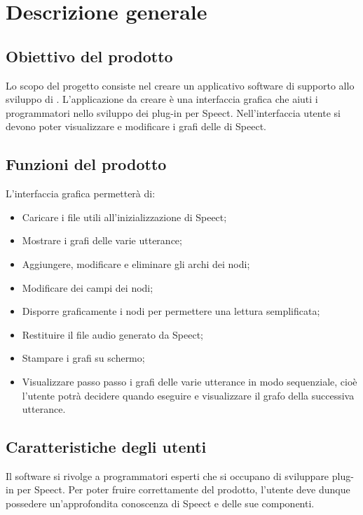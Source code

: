 \documentclass[../AnalisideiRequisiti.tex]{subfiles}
\begin{document}
	
\chapter{Descrizione generale}

\section{Obiettivo del prodotto}

Lo scopo del progetto consiste nel creare un applicativo software di supporto allo sviluppo di . L’applicazione da creare è una interfaccia grafica che aiuti i programmatori nello sviluppo dei plug-in per Speect. Nell’interfaccia utente si devono poter visualizzare e modificare i grafi delle  di Speect. 


\section{Funzioni del prodotto}
L’interfaccia grafica permetterà di:
\begin{itemize}
	\item{} Caricare i file  utili all’inizializzazione di Speect;
	\item{} Mostrare i grafi delle varie utterance;
	\item{} Aggiungere, modificare e eliminare gli archi dei nodi;
	\item{} Modificare dei campi dei nodi;
	\item{} Disporre graficamente i nodi per permettere una lettura semplificata;
	\item{} Restituire il file audio generato da Speect;
	\item{} Stampare i grafi su schermo;
	\item{} Visualizzare passo passo i grafi delle varie utterance in modo sequenziale, cioè l’utente potrà decidere quando eseguire e visualizzare il grafo della successiva utterance.	
\end{itemize}


\section{Caratteristiche degli utenti}
Il software si rivolge a programmatori esperti che si occupano di sviluppare plug-in per Speect. Per poter fruire correttamente del prodotto, l'utente deve dunque possedere un'approfondita conoscenza di Speect e delle sue componenti.
\end{document}
